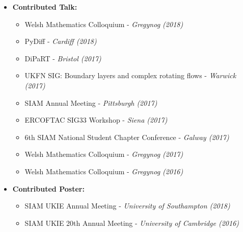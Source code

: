 \documentclass[10pt,a4paper,sans]{moderncv}        %
\begin{document}
\begin{itemize}
		\item{\textbf{Contributed Talk:}
				\small{
					\begin{itemize}
						\vspace{3pt}
						\item Welsh Mathematics Colloquium - \textit{Gregynog (2018)}
						\vspace{3pt}
						\item PyDiff - \textit{Cardiff (2018)}
						\vspace{3pt}
						\item DiPaRT - \textit{Bristol (2017)}
						\vspace{3pt}
						\item UKFN SIG: Boundary layers and complex rotating flows - \textit{Warwick (2017)}
						\vspace{3pt}
						\item SIAM Annual Meeting - \textit{Pittsburgh (2017)}
						\vspace{3pt}
						\item ERCOFTAC SIG33 Workshop - \textit{Siena (2017)}
						\vspace{3pt}
						\item 6th SIAM National Student Chapter Conference - \textit{Galway (2017)}
						\vspace{3pt}
						\item Welsh Mathematics Colloquium - \textit{Gregynog (2017)}
						\vspace{3pt}
						\item Welsh Mathematics Colloquium - \textit{Gregynog (2016)}
		\end{itemize}}
	}
		\vspace{6pt}
		\item{\textbf{Contributed Poster:}
			\small{
				\begin{itemize}
					\vspace{3pt}
					\item SIAM UKIE Annual Meeting - \textit{University of Southampton (2018)}
					\vspace{3pt}
					\item SIAM UKIE 20th Annual Meeting - \textit{University of Cambridge (2016)}
		\end{itemize}}}
		
	\end{itemize}

	
\end{document}
